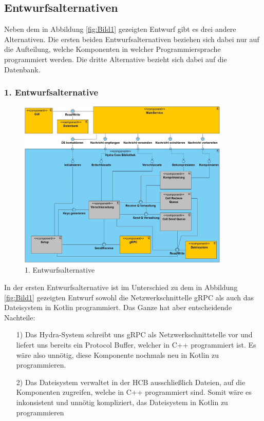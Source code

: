 \subsection{Entwurfsalternativen}
Neben dem in Abbildung \ref{fig:Bild1} gezeigten Entwurf gibt es drei andere Alternativen. Die ersten beiden Entwurfsalternativen beziehen sich dabei nur auf die Aufteilung, welche Komponenten in welcher Programmiersprache programmiert werden. Die dritte Alternative bezieht sich dabei auf die Datenbank.
\subsubsection{1. Entwurfsalternative}

\begin{figure}[h]
  \centering
     \includegraphics[width=0.9\textwidth]{diagramme/Component_Diagram_E1.jpg}
  \caption{1. Entwurfsalternative}
  \label{fig:Bild2}
\end{figure}

In der ersten Entwurfsalternative ist im Unterschied zu dem in Abbildung \ref{fig:Bild1} gezeigten Entwurf sowohl die Netzwerkschnittelle \ac{gRPC} als auch das Dateisystem  in Kotlin programmiert. Das Ganze hat aber entscheidende  Nachteile:
\begin{itemize}
\item[1)] Das Hydra-System schreibt uns \ac{gRPC} als Netzwerkschnittstelle vor und liefert uns bereits ein Protocol Buffer, welcher in C++ programmiert ist. Es wäre also unnötig, diese Komponente nochmals neu in Kotlin zu programmieren.
\item[2)]Das Dateisystem verwaltet in der \ac{HCB} ausschließlich Dateien, auf die Komponenten zugreifen, welche in C++ programmiert sind. Somit wäre es inkonsistent und unnötig kompliziert, das Dateisystem in Kotlin zu programmieren
\end{itemize}

